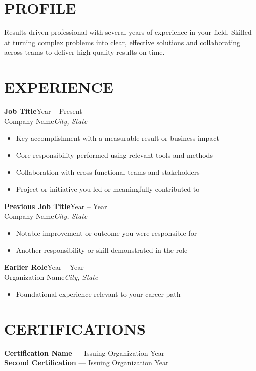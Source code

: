 \documentclass[10pt, letterpaper]{article}
\newcommand{\expentry}[4]{%
    {\bfseries #1}\hfill{\small #3}\\
    {\color{accent}#2}\hfill{\small\itshape #4}\par\vspace{2pt}
}
\newlength{\mainw}\setlength{\mainw}{0.60\textwidth}
\begin{document}
\begin{minipage}[t]{\mainw}
    \section{PROFILE}
    Results-driven professional with several years of experience in your field. Skilled at turning complex problems into clear, effective solutions and collaborating across teams to deliver high-quality results on time.

    \section{EXPERIENCE}
    \expentry{Job Title}{Company Name}{Year -- Present}{City, State}
    \begin{itemize}
        \item Key accomplishment with a measurable result or business impact
        \item Core responsibility performed using relevant tools and methods
        \item Collaboration with cross-functional teams and stakeholders
        \item Project or initiative you led or meaningfully contributed to
    \end{itemize}
    \vspace{6pt}
    \expentry{Previous Job Title}{Company Name}{Year -- Year}{City, State}
    \begin{itemize}
        \item Notable improvement or outcome you were responsible for
        \item Another responsibility or skill demonstrated in the role
    \end{itemize}
    \vspace{6pt}
    \expentry{Earlier Role}{Organization Name}{Year -- Year}{City, State}
    \begin{itemize}
        \item Foundational experience relevant to your career path
    \end{itemize}

    \section{CERTIFICATIONS}
    {\bfseries Certification Name} --- Issuing Organization \hfill {\small Year}\\
    {\bfseries Second Certification} --- Issuing Organization \hfill {\small Year}
\end{minipage}
\end{document}
